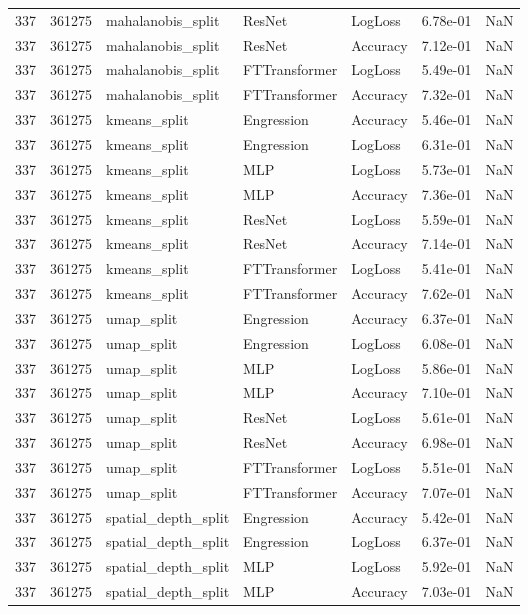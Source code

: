\begin{tabular}{rrlllrr}
337 & 361275 & mahalanobis\_split & ResNet & LogLoss & 6.78e-01 & NaN \\
337 & 361275 & mahalanobis\_split & ResNet & Accuracy & 7.12e-01 & NaN \\
337 & 361275 & mahalanobis\_split & FTTransformer & LogLoss & 5.49e-01 & NaN \\
337 & 361275 & mahalanobis\_split & FTTransformer & Accuracy & 7.32e-01 & NaN \\
337 & 361275 & kmeans\_split & Engression & Accuracy & 5.46e-01 & NaN \\
337 & 361275 & kmeans\_split & Engression & LogLoss & 6.31e-01 & NaN \\
337 & 361275 & kmeans\_split & MLP & LogLoss & 5.73e-01 & NaN \\
337 & 361275 & kmeans\_split & MLP & Accuracy & 7.36e-01 & NaN \\
337 & 361275 & kmeans\_split & ResNet & LogLoss & 5.59e-01 & NaN \\
337 & 361275 & kmeans\_split & ResNet & Accuracy & 7.14e-01 & NaN \\
337 & 361275 & kmeans\_split & FTTransformer & LogLoss & 5.41e-01 & NaN \\
337 & 361275 & kmeans\_split & FTTransformer & Accuracy & 7.62e-01 & NaN \\
337 & 361275 & umap\_split & Engression & Accuracy & 6.37e-01 & NaN \\
337 & 361275 & umap\_split & Engression & LogLoss & 6.08e-01 & NaN \\
337 & 361275 & umap\_split & MLP & LogLoss & 5.86e-01 & NaN \\
337 & 361275 & umap\_split & MLP & Accuracy & 7.10e-01 & NaN \\
337 & 361275 & umap\_split & ResNet & LogLoss & 5.61e-01 & NaN \\
337 & 361275 & umap\_split & ResNet & Accuracy & 6.98e-01 & NaN \\
337 & 361275 & umap\_split & FTTransformer & LogLoss & 5.51e-01 & NaN \\
337 & 361275 & umap\_split & FTTransformer & Accuracy & 7.07e-01 & NaN \\
337 & 361275 & spatial\_depth\_split & Engression & Accuracy & 5.42e-01 & NaN \\
337 & 361275 & spatial\_depth\_split & Engression & LogLoss & 6.37e-01 & NaN \\
337 & 361275 & spatial\_depth\_split & MLP & LogLoss & 5.92e-01 & NaN \\
337 & 361275 & spatial\_depth\_split & MLP & Accuracy & 7.03e-01 & NaN \\

\end{tabular}
